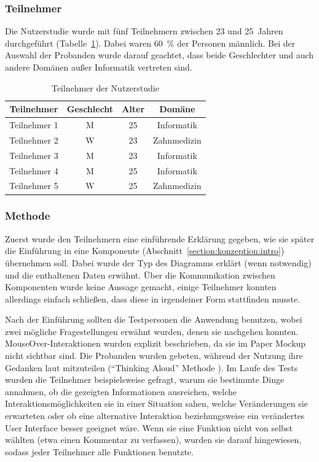 \documentclass[
	headsepline,
	footsepline,
	fontsize=12pt,
	bibliography=totoc
]{scrbook}
\begin{document}
\subsubsection{Teilnehmer}

Die Nutzerstudie wurde mit fünf Teilnehmern zwischen 23 und 25~Jahren durchgeführt (Tabelle~\ref{table:mockup:teilnehmer}). Dabei waren 60~\% der Personen männlich. Bei der Auswahl der Probanden wurde darauf geachtet, dass beide Geschlechter und auch andere Domänen außer Informatik vertreten sind.

\begin{table}[htbp]
	\centering
    \begin{tabular}{c|c|c|c}
    Teilnehmer   & Geschlecht & Alter & Domäne      \\
    \hline
    Teilnehmer 1 & M          & 25    & Informatik  \\ %
    Teilnehmer 2 & W          & 23    & Zahnmedizin \\ %
    Teilnehmer 3 & M          & 23    & Informatik  \\ %
    Teilnehmer 4 & M          & 25    & Informatik  \\ %
    Teilnehmer 5 & W          & 25    & Zahnmedizin \\ %
    \end{tabular}
    \caption{Teilnehmer der Nutzerstudie}
    \label{table:mockup:teilnehmer}
\end{table}

\subsubsection{Methode}


Zuerst wurde den Teilnehmern eine einführende Erklärung gegeben, wie sie später die Einführung in eine Komponente (Abschnitt~\ref{section:konzeption:intro}) übernehmen soll. Dabei wurde der Typ des Diagramms erklärt (wenn notwendig) und die enthaltenen Daten erwähnt. Über die Kommunikation zwischen Komponenten wurde keine Aussage gemacht, einige Teilnehmer konnten allerdings einfach schließen, dass diese in irgendeiner Form stattfinden musste. 


Nach der Einführung sollten die Testpersonen die Anwendung benutzen, wobei zwei mögliche Fragestellungen erwähnt wurden, denen sie nachgehen konnten. MouseOver-Interaktionen wurden explizit beschrieben, da sie im Paper Mockup nicht sichtbar sind. Die Probanden wurden gebeten, während der Nutzung ihre Gedanken laut mitzuteilen (\enquote{Thinking Aloud} Methode \cite{vanSomeren1994}). Im Laufe des Tests wurden die Teilnehmer beispielsweise gefragt, warum sie bestimmte Dinge annahmen, ob die gezeigten Informationen ausreichen, welche Interaktionsmöglichkeiten sie in einer Situation sahen, welche Veränderungen sie erwarteten oder ob eine alternative Interaktion beziehungsweise ein verändertes User Interface besser geeignet wäre. Wenn sie eine Funktion nicht von selbst wählten (etwa einen Kommentar zu verfassen), wurden sie darauf hingewiesen, sodass jeder Teilnehmer alle Funktionen benutzte.
\end{document}
